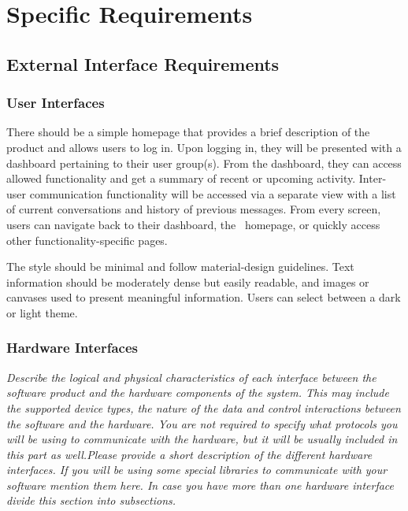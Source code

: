 
\section{Specific Requirements}\label{sec:specific-requirements}
    \subsection{External Interface Requirements}\label{sec:external-interface-requirements}
        \subsubsection{User Interfaces}\label{sec:user-interfaces}
            There should be a simple homepage that provides a brief description of the product and allows users to log in. Upon logging in, they will be presented with a dashboard pertaining to their user group(s). From the dashboard, they can access allowed functionality and get a summary of recent or upcoming activity. Inter-user communication functionality will be accessed via a separate view with a list of current conversations and history of previous messages. From every screen, users can navigate back to their dashboard, the \projectName\ homepage, or quickly access other functionality-specific pages.
            \par The style should be minimal and follow \gls{material-design} guidelines. Text information should be moderately dense but easily readable, and images or canvases used to present meaningful information. Users can select between a dark or light theme.
        \subsubsection{Hardware Interfaces}\label{sec:hardware-interfaces}
            \emph{Describe the logical and physical characteristics of each interface between the software product and the hardware components of the system. This may include the supported device types, the nature of the data and control interactions between the software and the hardware. You are not required to specify what protocols you will be using to communicate with the hardware, but it will be usually included in this part as well.\gnl Please provide a short description of the different hardware interfaces. If you will be using some special libraries to communicate with your software mention them here. In case you have more than one hardware interface divide this section into subsections.}
